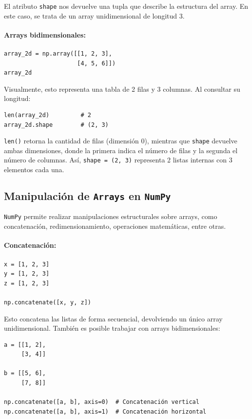 \documentclass{article}
\theoremstyle{nonumberplain}
\begin{document}
El atributo \texttt{shape} nos devuelve una tupla que describe la estructura del array. En este caso, se trata de un array unidimensional de longitud 3.

\paragraph{Arrays bidimensionales:}

\begin{verbatim}
array_2d = np.array([[1, 2, 3],
                     [4, 5, 6]])
array_2d
\end{verbatim}

Visualmente, esto representa una tabla de 2 filas y 3 columnas. Al consultar su longitud:

\begin{verbatim}
len(array_2d)         # 2
array_2d.shape        # (2, 3)
\end{verbatim}

\texttt{len()} retorna la cantidad de filas (dimensión 0), mientras que \texttt{shape} devuelve ambas dimensiones, donde la primera indica el número de filas y la segunda el número de columnas. Así, \texttt{shape = (2, 3)} representa 2 listas internas con 3 elementos cada una.

\subsection*{Manipulación de \texttt{Arrays} en \texttt{NumPy}}

\texttt{NumPy} permite realizar manipulaciones estructurales sobre arrays, como concatenación, redimensionamiento, operaciones matemáticas, entre otras.

\paragraph{Concatenación:}

\begin{verbatim}
x = [1, 2, 3]
y = [1, 2, 3]
z = [1, 2, 3]

np.concatenate([x, y, z])
\end{verbatim}

Esto concatena las listas de forma secuencial, devolviendo un único array unidimensional. También es posible trabajar con arrays bidimensionales:

\begin{verbatim}
a = [[1, 2],
     [3, 4]]

b = [[5, 6],
     [7, 8]]

np.concatenate([a, b], axis=0)  # Concatenación vertical
np.concatenate([a, b], axis=1)  # Concatenación horizontal
\end{verbatim}
\end{document}
